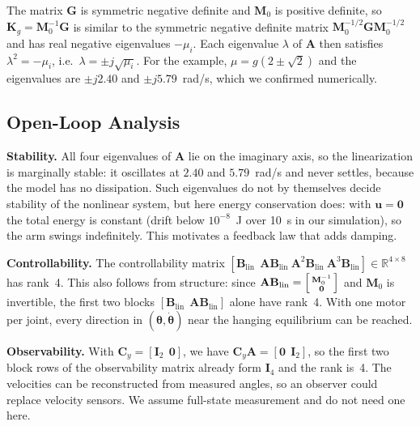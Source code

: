 \documentclass[letterpaper, 10pt, conference]{ieeeconf}
\begin{document}
The matrix $\mathbf{G}$ is symmetric negative definite and
$\mathbf{M}_0$ is positive definite, so
$\mathbf{K}_g=\mathbf{M}_0^{-1}\mathbf{G}$ is similar to the
symmetric negative definite matrix
$\mathbf{M}_0^{-1/2}\mathbf{G}\mathbf{M}_0^{-1/2}$ and
has real negative eigenvalues $-\mu_i$. Each eigenvalue
$\lambda$ of $\mathbf{A}$ then satisfies
$\lambda^2=-\mu_i$, i.e.\ $\lambda=\pm j\sqrt{\mu_i}$. For
the example, $\mu=g(2\pm\sqrt2)$ and the eigenvalues are
$\pm j2.40$ and $\pm j5.79$~rad/s, which we confirmed
numerically.

\subsection{Open-Loop Analysis}

\textbf{Stability.} All four eigenvalues of $\mathbf{A}$ lie
on the imaginary axis, so the linearization is marginally
stable: it oscillates at $2.40$ and $5.79$~rad/s and never
settles, because the model has no dissipation. Such
eigenvalues do not by themselves decide stability of the
nonlinear system, but here energy conservation does: with
$\mathbf{u}=\mathbf{0}$ the total energy is constant (drift
below $10^{-8}$~J over 10~s in our simulation), so the arm
swings indefinitely. This motivates a feedback law that
adds damping.

\textbf{Controllability.} The controllability matrix
$[\mathbf{B}_{\mathrm{lin}}\ \ \mathbf{A}\mathbf{B}_{\mathrm{lin}}\
\mathbf{A}^2\mathbf{B}_{\mathrm{lin}}\
\mathbf{A}^3\mathbf{B}_{\mathrm{lin}}]\in\mathbb{R}^{4\times8}$
has rank~4. This also follows from structure: since
$\mathbf{A}\mathbf{B}_{\mathrm{lin}}=
\begin{bsmallmatrix}\mathbf{M}_0^{-1}\\ \mathbf{0}\end{bsmallmatrix}$
and $\mathbf{M}_0$ is invertible, the first two blocks
$[\mathbf{B}_{\mathrm{lin}}\ \ \mathbf{A}\mathbf{B}_{\mathrm{lin}}]$
alone have rank~4. With one motor per joint, every direction
in $(\boldsymbol{\theta},\dot{\boldsymbol{\theta}})$ near the
hanging equilibrium can be reached.

\textbf{Observability.} With $\mathbf{C}_y=[\mathbf{I}_2\ \
\mathbf{0}]$, we have
$\mathbf{C}_y\mathbf{A}=[\mathbf{0}\ \ \mathbf{I}_2]$, so the
first two block rows of the observability matrix already form
$\mathbf{I}_4$ and the rank is~4. The velocities can be
reconstructed from measured angles, so an observer could
replace velocity sensors. We assume full-state measurement
and do not need one here.
\end{document}
